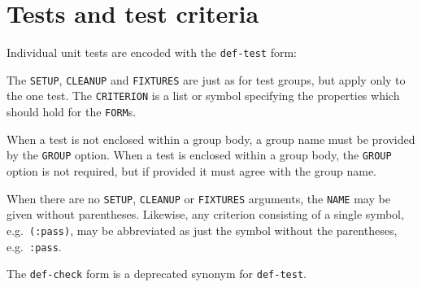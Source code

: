 
\section{Tests and test criteria}
\label{sec:deftest}
Individual unit tests are encoded with the \texttt{def-test} form:

%
The \texttt{SETUP}, \texttt{CLEANUP} and \texttt{FIXTURES} are just as
for test groups, but apply only to the one test.  The
\texttt{CRITERION} is a list or symbol specifying the properties which
should hold for the \texttt{FORM}s.

When a test is not enclosed within a group body, a group name must be
provided by the \texttt{GROUP} option.  When a test is enclosed within
a group body, the \texttt{GROUP} option is not required, but if
provided it must agree with the group name.

When there are no \texttt{SETUP}, \texttt{CLEANUP} or
\texttt{FIXTURES} arguments, the \texttt{NAME} may be given without
parentheses.  Likewise, any criterion consisting of a single symbol,
e.g.\ \texttt{(:pass)}, may be abbreviated as just the symbol without
the parentheses, e.g.\ \texttt{:pass}.

The \texttt{def-check} form is a deprecated synonym for
\texttt{def-test}.

\def\criteriaGroup#1#2{\subsection{#1} #2}
\def\secText#1{#1}
\def\endcriteriaGroup{}
\def\manualOrRef#1#2{#1}
\def\criteriaDoc#1#2#3#4#5#6#7#8{%
\subsubsection{The \texttt{#2} criterion} 
#4\index{#1@\texttt{#2}}
\\ Syntax: \texttt{#3}
#7{#8}#6}
\def\noEx#1{}
\def\singleEx#1{\\Example: \texttt{#1}}
\def\multiEx#1{#1}
\def\passExample#1{\\Passing example: \texttt{#1}}
\def\failExample#1{\\Failing example: \texttt{#1}}
\def\tabbingEx#1{\\Example: \begin{tabbing}#1\end{tabbing}}
\def\noExpl{}
\def\hasExpl#1{\par#1}


